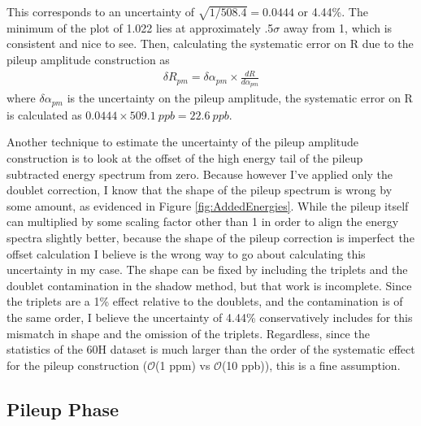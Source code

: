 		This corresponds to an uncertainty of $\sqrt{1/508.4} = 0.0444$ or 4.44\%. The minimum of the \chisq plot of 1.022 lies at approximately .5$\sigma$ away from 1, which is consistent and nice to see. Then, calculating the systematic error on R due to the pileup amplitude construction as 
			\begin{align}
				\delta R_{pm} = \delta\alpha_{pm} \times \frac{dR}{d\alpha_{pm}}
			\end{align}
		where $\delta\alpha_{pm}$ is the uncertainty on the pileup amplitude, the systematic error on R is calculated as $0.0444 \times \SI{509.1}{ppb} = \SI{22.6}{ppb}$.

		Another technique to estimate the uncertainty of the pileup amplitude construction is to look at the offset of the high energy tail of the pileup subtracted energy spectrum from zero. Because however I've applied only the doublet correction, I know that the shape of the pileup spectrum is wrong by some amount, as evidenced in Figure \ref{fig:AddedEnergies}. While the pileup itself can multiplied by some scaling factor other than 1 in order to align the energy spectra slightly better, because the shape of the pileup correction is imperfect the offset calculation I believe is the wrong way to go about calculating this uncertainty in my case. The shape can be fixed by including the triplets and the doublet contamination in the shadow method, but that work is incomplete. Since the triplets are a 1\% effect relative to the doublets, and the contamination is of the same order, I believe the uncertainty of 4.44\% conservatively includes for this mismatch in shape and the omission of the triplets. Regardless, since the statistics of the 60H dataset is much larger than the order of the systematic effect for the pileup construction ($\mathcal{O}$(1 ppm) vs $\mathcal{O}$(10 ppb)), this is a fine assumption.

	\subsection{Pileup Phase}
	\label{SubSec:PileupPhase}


